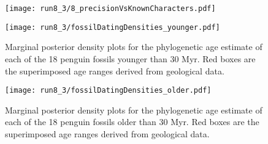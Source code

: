 \documentclass[11pt]{article}
\begin{document}
\begin{figure}
\texttt{[image: run8\_3/8\_precisionVsKnownCharacters.pdf]}
\end{figure}

\begin{figure}
\texttt{[image: run8\_3/fossilDatingDensities\_younger.pdf]}
\caption{Marginal posterior density plots for the phylogenetic age estimate of each of the 18 penguin fossils younger than 30 Myr. Red boxes are the superimposed age ranges derived from geological data.}
\end{figure}

\begin{figure}
\texttt{[image: run8\_3/fossilDatingDensities\_older.pdf]}
\caption{Marginal posterior density plots for the phylogenetic age estimate of each of the 18 penguin fossils older than 30 Myr. Red boxes are the superimposed age ranges derived from geological data.}
\end{figure}
\end{document}
